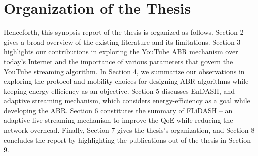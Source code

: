 \section{Organization of the Thesis}
Henceforth, this synopsis report of the thesis is organized as follows. Section 2 gives a broad overview of the existing literature and its limitations. Section 3 highlights our contributions in exploring the YouTube ABR mechanism over today's Internet and the importance of various parameters that govern the YouTube streaming algorithm. In Section 4, we summarize our observations in exploring the protocol and mobility choices for designing ABR algorithms while keeping energy-efficiency as an objective. Section  5 discusses EnDASH, and adaptive streaming mechanism, which considers energy-efficiency as a goal while developing the ABR. Section 6 constitutes the summary of FLiDASH -- an adaptive live streaming mechanism to improve the QoE while reducing the network overhead. Finally, Section 7 gives the thesis's organization, and Section 8 concludes the report by highlighting the publications out of the thesis in Section 9.

